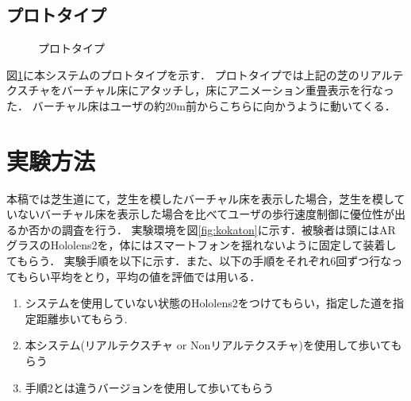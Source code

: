\documentclass[dvipdfmx]{jsarticle}
\begin{document}
\subsection{プロトタイプ}
\begin{figure}[t]
    \centering
    \caption{プロトタイプ}
    \label{fig:puroto}
\end{figure}
図\ref{fig:puroto}に本システムのプロトタイプを示す．
プロトタイプでは上記の芝のリアルテクスチャをバーチャル床にアタッチし，床にアニメーション重畳表示を行なった．
バーチャル床はユーザの約20m前からこちらに向かうように動いてくる．
\section{実験方法}

本稿では芝生道にて，芝生を模したバーチャル床を表示した場合，芝生を模していないバーチャル床を表示した場合を比べてユーザの歩行速度制御に優位性が出るか否かの調査を行う．
実験環境を図\ref{fig:kokaton}に示す．被験者は頭にはARグラスのHololens2を，体にはスマートフォンを揺れないように固定して装着してもらう．
実験手順を以下に示す．また、以下の手順をそれぞれ6回ずつ行なってもらい平均をとり，平均の値を評価では用いる．
\begin{enumerate}
    \item システムを使用していない状態のHololens2をつけてもらい，指定した道を指定距離歩いてもらう.
    \item 本システム(リアルテクスチャ or Nonリアルテクスチャ)を使用して歩いてもらう
    \item 手順2とは違うバージョンを使用して歩いてもらう
\end{enumerate}
\end{document}
